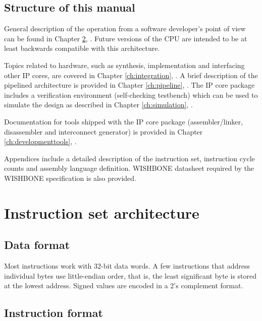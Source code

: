 \documentclass[a4paper,12pt,twoside,extrafontsizes]{memoir}
\begin{document}
\section{Structure of this manual}

General description of the \lxp{} operation from a software developer's point of view can be found in Chapter \ref{ch:isa}, . Future versions of the \lxp{} CPU are intended to be at least backwards compatible with this architecture.

Topics related to hardware, such as synthesis, implementation and interfacing other IP cores, are covered in Chapter \ref{ch:integration}, . A brief description of the \lxp{} pipelined architecture is provided in Chapter \ref{ch:pipeline}, . The \lxp{} IP core package includes a verification environment (self-checking testbench) which can be used to simulate the design as described in Chapter \ref{ch:simulation}, .

Documentation for tools shipped with the \lxp{} IP core package (assembler/linker, disassembler and interconnect generator) is provided in Chapter \ref{ch:developmenttools}, .

Appendices include a detailed description of the \lxp{} instruction set, instruction cycle counts and \lxp{} assembly language definition. WISHBONE datasheet required by the WISHBONE specification is also provided.

\chapter{Instruction set architecture}
\label{ch:isa}

\section{Data format}

Most \lxp{} instructions work with 32-bit data words. A few instructions that address individual bytes use little-endian order, that is, the least significant byte is stored at the lowest address. Signed values are encoded in a 2's complement format.

\section{Instruction format}
\label{sec:instructionformat}
\end{document}

